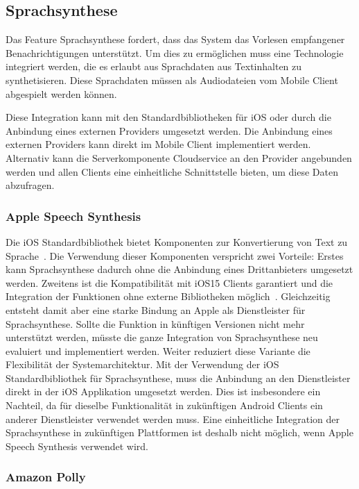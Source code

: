 \subsection{Sprachsynthese}

Das Feature Sprachsynthese fordert, dass das System das Vorlesen empfangener Benachrichtigungen unterstützt.
Um dies zu ermöglichen muss eine Technologie integriert werden, die es erlaubt aus Sprachdaten aus Textinhalten zu synthetisieren.
Diese Sprachdaten müssen als Audiodateien vom Mobile Client abgespielt werden können.

Diese Integration kann mit den Standardbibliotheken für iOS oder durch die Anbindung eines externen Providers umgesetzt werden.
Die Anbindung eines externen Providers kann direkt im Mobile Client implementiert werden.
Alternativ kann die Serverkomponente Cloudservice an den Provider angebunden werden und allen Clients eine einheitliche Schnittstelle bieten, um diese Daten abzufragen.

\subsubsection{Apple Speech Synthesis}

Die iOS Standardbibliothek bietet Komponenten zur Konvertierung von Text zu Sprache~\cite{ios_speech_synthesis}.
Die Verwendung dieser Komponenten verspricht zwei Vorteile:
Erstes kann Sprachsynthese dadurch ohne die Anbindung eines Drittanbieters umgesetzt werden.
Zweitens ist die Kompatibilität mit iOS15 Clients garantiert und die Integration der Funktionen ohne externe Bibliotheken möglich~\cite{ios_speech_synthesis}.
Gleichzeitig entsteht damit aber eine starke Bindung an Apple als Dienstleister für Sprachsynthese.
Sollte die Funktion in künftigen Versionen nicht mehr unterstützt werden, müsste die ganze Integration von Sprachsynthese neu evaluiert und implementiert werden.
Weiter reduziert diese Variante die Flexibilität der Systemarchitektur.
Mit der Verwendung der iOS Standardbibliothek für Sprachsynthese, muss die Anbindung an den Dienstleister direkt in der iOS Applikation umgesetzt werden.
Dies ist insbesondere ein Nachteil, da für dieselbe Funktionalität in zukünftigen Android Clients ein anderer Dienstleister verwendet werden muss.
Eine einheitliche Integration der Sprachsynthese in zukünftigen Plattformen ist deshalb nicht möglich, wenn Apple Speech Synthesis verwendet wird.

\subsubsection{Amazon Polly}

